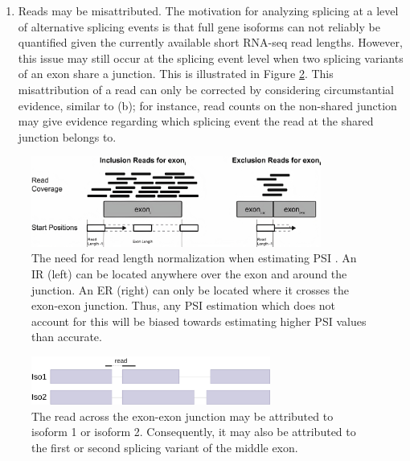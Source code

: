 \begin{enumerate}[label=(\alph*)]
	
	
	\item Reads may be misattributed. The motivation for analyzing splicing at a level of alternative splicing events is that full gene isoforms can not reliably be quantified given the currently available short RNA-seq read lengths. However, this issue may still occur at the splicing event level when two splicing variants of an exon share a junction. This is illustrated in Figure \ref{fig:misattribution}.
	This misattribution of a read can only be corrected by considering circumstantial evidence, similar to (b); for instance, read counts on the non-shared junction may give evidence regarding which splicing event the read at the shared junction belongs to.
\end{enumerate}


\begin{figure}
	\centering\includegraphics[width=0.85\textwidth]{../visualizations/ch4-methods/read_length_normalization.jpg} 
	\caption{
		The need for read length normalization when estimating PSI \cite{berlinpsi}. An IR (left) can be located anywhere over the exon and around the junction. An ER (right) can only be located where it crosses the exon-exon junction. Thus, any PSI estimation which does not account for this will be biased towards estimating higher PSI values than accurate. 
	}
	\label{fig:readlengthnorm}
\end{figure}

\begin{figure}
	\centering\includegraphics[width=0.7\textwidth]{../visualizations/ch4-methods/visualizations-misattribution.pdf} 
	\caption{The read across the exon-exon junction may be attributed to isoform 1 or isoform 2. Consequently, it may also be attributed to the first or second splicing variant of the middle exon.}
	\label{fig:misattribution}
\end{figure}

